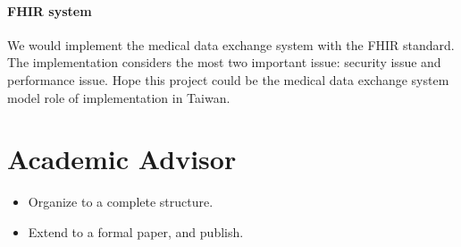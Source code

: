 \documentclass[12pt,a4paper]{IEEEconf}
\begin{document}
\paragraph{FHIR system}
We would implement the medical data exchange system with the FHIR standard. The implementation
considers the most two important issue: security issue and performance issue. Hope this project
could be the medical data exchange system model role of implementation in Taiwan.

\printbibheading[heading=bibnumbered]
\printbibliography\newrefcontext

\section{Academic Advisor}
\begin{itemize}
  \item Organize to a complete structure.
  \item Extend to a formal paper, and publish.
\end{itemize}
\end{document}
